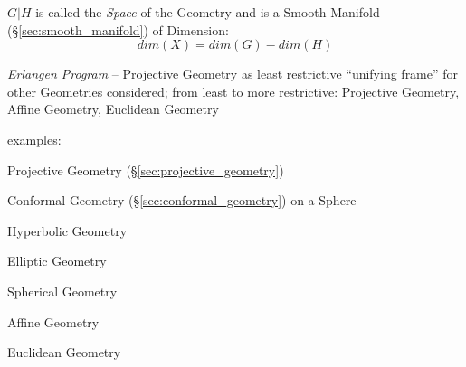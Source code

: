 $G|H$ is called the \emph{Space} of the Geometry and is a Smooth
Manifold (\S\ref{sec:smooth_manifold}) of Dimension:
\[
  dim(X) = dim(G) - dim(H)
\]

\emph{Erlangen Program} -- Projective Geometry as least restrictive
``unifying frame'' for other Geometries considered; from least to more
restrictive: Projective Geometry, Affine Geometry, Euclidean Geometry

examples: %

Projective Geometry (\S\ref{sec:projective_geometry})

Conformal Geometry (\S\ref{sec:conformal_geometry}) on a Sphere

Hyperbolic Geometry

Elliptic Geometry

Spherical Geometry

Affine Geometry

Euclidean Geometry
